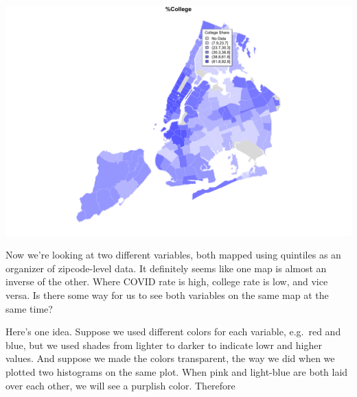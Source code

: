 \documentclass[
  openany]{book}
\newenvironment{Shaded}{\begin{snugshade}}{\end{snugshade}}
\newcommand{\AttributeTok}[1]{\textcolor[rgb]{0.77,0.63,0.00}{#1}}
\newcommand{\DecValTok}[1]{\textcolor[rgb]{0.00,0.00,0.81}{#1}}
\newcommand{\FloatTok}[1]{\textcolor[rgb]{0.00,0.00,0.81}{#1}}
\newcommand{\FunctionTok}[1]{\textcolor[rgb]{0.00,0.00,0.00}{#1}}
\newcommand{\NormalTok}[1]{#1}
\newcommand{\SpecialCharTok}[1]{\textcolor[rgb]{0.00,0.00,0.00}{#1}}
\newcommand{\StringTok}[1]{\textcolor[rgb]{0.31,0.60,0.02}{#1}}
\begin{document}
\begin{Shaded}
\end{Shaded}

\begin{center}\includegraphics[width=0.9\linewidth]{carpedatum_files/figure-html/unnamed-chunk-95-2} \end{center}

Now we're looking at two different variables, both mapped using quintiles as an organizer of zipcode-level data. It definitely seems like one map is almost an inverse of the other. Where COVID rate is high, college rate is low, and vice versa. Is there some way for us to see both variables on the same map at the same time?

Here's one idea. Suppose we used different colors for each variable, e.g.~red and blue, but we used shades from lighter to darker to indicate lowr and higher values. And suppose we made the colors transparent, the way we did when we plotted two histograms on the same plot. When pink and light-blue are both laid over each other, we will see a purplish color. Therefore
\end{document}
